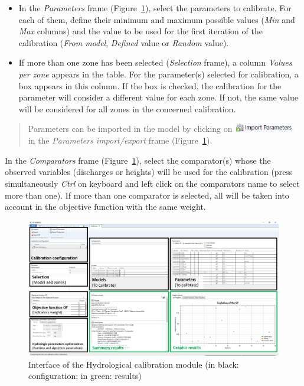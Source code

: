 \documentclass[
  letterpaper,
  DIV=11,
  numbers=noendperiod]{scrreprt}
\begin{document}
\begin{itemize}
\item
  {In the \emph{Parameters} frame
  (Figure~\ref{fig-calibrator_interface}), select the parameters to
  calibrate. For each of them, define their minimum and maximum possible
  values (\emph{Min} and \emph{Max} columns) and the value to be used
  for the first iteration of the calibration (\emph{From model},
  \emph{Defined} value or \emph{Random} value).}
\item
  {If more than one zone has been selected (\emph{Selection} frame), a
  column \emph{Values per zone} appears in the table. For the
  parameter(s) selected for calibration, a box appears in this column.
  If the box is checked, the calibration for the parameter will consider
  a different value for each zone. If not, the same value will be
  considered for all zones in the concerned calibration.}
\end{itemize}

\begin{quote}
Parameters can be imported in the model by clicking on
\includegraphics[width=\textwidth,height=0.16in]{./figures/fig-icon_calibrator_import_param.png}
in the \emph{Parameters import/export} frame
(Figure~\ref{fig-calibrator_interface}).
\end{quote}

{In the \emph{Comparators} frame
(Figure~\ref{fig-calibrator_interface}), select the comparator(s) whose
the observed variables (discharges or heights) will be used for the
calibration (press simultaneously \emph{Ctrl} on keyboard and left click
on the comparators name to select more than one).} If more than one
comparator is selected, all will be taken into account in the objective
function with the same weight.

\begin{figure}

{\centering \includegraphics{./figures/fig-calibrator_interface.png}

}

\caption{\label{fig-calibrator_interface}Interface of the Hydrological
calibration module (in black: configuration; in green: results)}

\end{figure}
\end{document}
